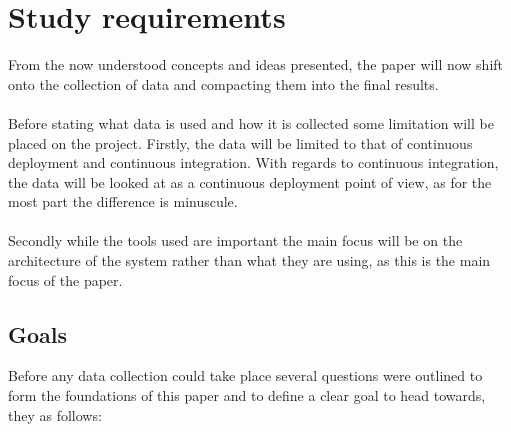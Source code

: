 %
%
%
%
%
%

\section{Study requirements}

From the now understood concepts and ideas presented, the paper will now shift onto the collection of data and compacting them into the final results. 
\\\\
Before stating what data is used and how it is collected some limitation will be placed on the project. Firstly, the data will be limited to that of continuous deployment and continuous integration. With regards to continuous integration, the data will be looked at as a continuous deployment point of view, as for the most part the difference is minuscule.
\\\\
Secondly while the tools used are important the main focus will be on the architecture of the system rather than what they are using, as this is the main focus of the paper.

\subsection{Goals}

Before any data collection could take place several questions were outlined to form the foundations of this paper and to define a clear goal to head towards, they as follows:

